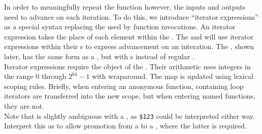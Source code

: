 In order to meaningfully repeat the function however, the inputs and outputs need to advance on each iteration.
To do this, we introduce ``iterator expressions'' as a special syntax replacing the  used by function invocations.
An iterator expression takes the place of each  element within the .
The  and  will use iterator expressions within their s to express advancement on an interation.
The , shown later, has the same form as a , but with s instead of regular .\\

Iterator expressions require the  object of the .
Their arithmetic uses integers in the range $0$ through $2^{64} -1$ with wraparound.
The  map is updated using lexical scoping rules.
Briefly, when entering an anonymous function, containing loop iterators are transferred into the new scope, but when entering named functions, they are not.\\

Note that  is slightly ambiguous with a , as \texttt{\$123} could be interpreted either way.
Interpret this as to allow promotion from a  to a , where the latter is required.\\

